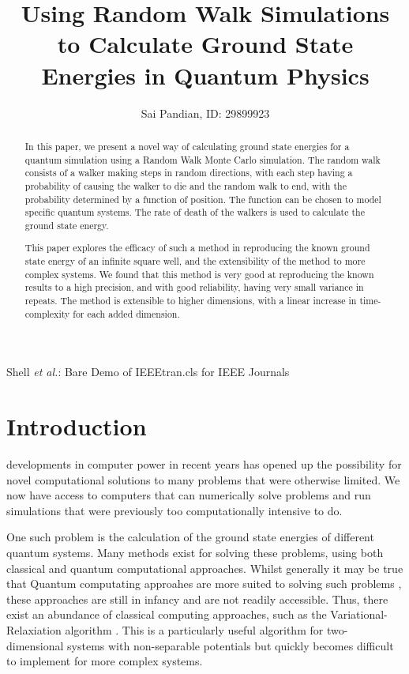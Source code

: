 \documentclass[journal]{IEEEtran}
\begin{document}
\title{Using Random Walk Simulations to Calculate Ground State Energies in
  Quantum Physics}

\author{Sai Pandian, ID: 29899923}%
        
{Shell \MakeLowercase{\textit{et al.}}: Bare Demo of IEEEtran.cls for IEEE Journals}

\maketitle

\begin{abstract}
  In this paper, we present a novel way of calculating ground state energies for
  a quantum simulation using a Random Walk Monte Carlo simulation. The random
  walk consists of a walker making steps in random directions, with each step
  having a probability of causing the walker to die and the random walk to end,
  with the probability determined by a function of position. The function can be
  chosen to model specific quantum systems. The rate of death of the walkers is
  used to calculate the ground state energy.

  This paper explores the efficacy of such a method in reproducing the known
  ground state energy of an infinite square well, and the extensibility of the
  method to more complex systems. We found that this method is very good at
  reproducing the known results to a high precision, and with good reliability,
  having very small variance in repeats. The method is extensible to higher
  dimensions, with a linear increase in time-complexity for each added dimension.
\end{abstract}



\section{Introduction}
 developments in computer power in recent years has opened
up the possibility for novel computational solutions to many problems that were
otherwise limited. We now have access to computers that can numerically solve
problems and run simulations that were previously too computationally intensive
to do.

One such problem is the calculation of the ground state energies of different
quantum systems. Many methods exist for solving these problems, using both
classical and quantum computational approaches. Whilst generally it may be true
that Quantum computating approahes are more suited to solving such problems
\cite{Mazzola}, these approaches are still in infancy and are not readily
accessible. Thus, there exist an abundance of classical computing approaches,
such as the Variational-Relaxiation algorithm \cite{Schroeder2017}. This is a
particularly useful algorithm for two-dimensional systems with non-separable
potentials but quickly becomes difficult to implement for more complex systems.
\end{document}
